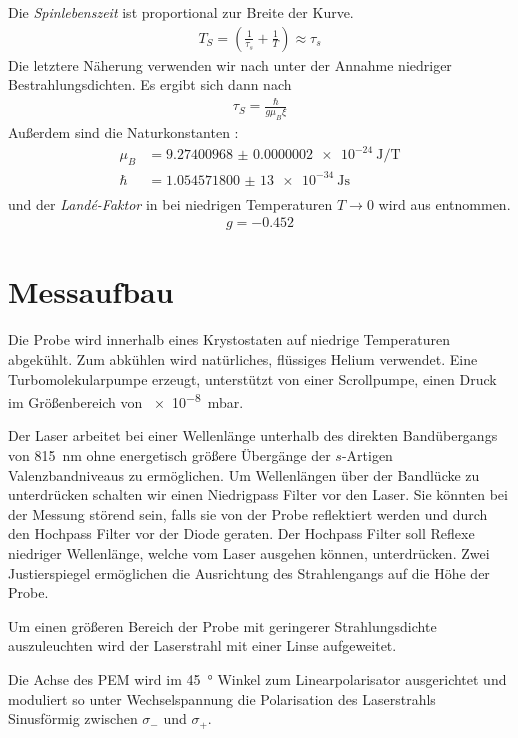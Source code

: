 \documentclass[11pt,twoside=true]{scrartcl}
\begin{document}
Die \emph{Spinlebenszeit} ist proportional zur Breite der Kurve.
%
\begin{align} 
  T_S = \left( \frac{1}{\tau_s} + \frac{1}{T} \right)\approx \tau_s
  \label{eq:spinrel}
 \end{align} %
Die letztere Näherung verwenden wir nach \cite{dzhioev2002low} unter
der Annahme niedriger Bestrahlungsdichten.
%
Es ergibt sich dann nach \cite{fpspindynamik}
%
\begin{align*}
  \tau_S = \frac{\hbar}{g \mu_B \xi}
\end{align*}
%
Außerdem sind die Naturkonstanten \cite{mohr2012codata}:
%
\begin{align*}
  \mu_B &= \SI{9.27400968(20)e-24}{\joule\per\tesla} \\
  \hbar &= \SI{1.054 571 800(13)e-34}{\joule\second} \\
\end{align*}
%
und der \emph{Landé-Faktor} in  bei niedrigen Temperaturen $T \to 0$ 
wird aus \cite{zawadzki2008temperature} entnommen.
%
\begin{align*}
  g = -0.452 
\end{align*}
%
\section{Messaufbau}

Die Probe wird innerhalb eines Krystostaten auf niedrige Temperaturen
abgekühlt. Zum abkühlen wird natürliches, flüssiges Helium verwendet. Eine
Turbomolekularpumpe erzeugt, unterstützt von einer Scrollpumpe, einen Druck
im Größenbereich von \SI{e-8}{\milli\bar}.

Der Laser arbeitet bei einer Wellenlänge unterhalb des direkten Band\-übergangs
von \SI{815}{\nano\metre} ohne energetisch größere Übergänge der $s$-Artigen
Valenzbandniveaus zu ermöglichen.  Um Wellenlängen über der Bandlücke zu
unterdrücken schalten wir einen Niedrigpass Filter vor den Laser. Sie könnten
bei der Messung störend sein, falls sie von der Probe reflektiert werden und
durch den Hochpass Filter vor der Diode geraten. Der Hochpass Filter soll
Reflexe niedriger Wellenlänge, welche vom Laser ausgehen können, unterdrücken.
Zwei Justierspiegel ermöglichen die Ausrichtung des Strahlengangs auf die Höhe
der Probe. 

Um einen größeren Bereich der Probe mit geringerer Strahlungsdichte
auszuleuchten wird der Laserstrahl mit einer Linse aufgeweitet.

Die Achse des PEM wird im \SI{45}{\degree} Winkel zum Linearpolarisator
ausgerichtet und moduliert so unter Wechselspannung die Polarisation des
Laserstrahls Sinusförmig zwischen $\sigma_-$ und $\sigma_+$.
\end{document}
